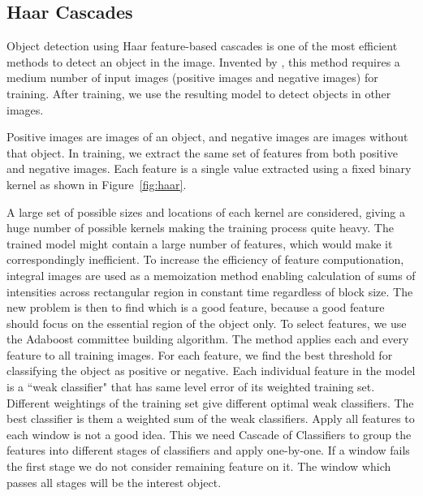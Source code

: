 \subsection{Haar Cascades}
Object detection using Haar feature-based cascades is one of the most efficient methods to detect an object in the image. Invented by , this method requires a medium number of input images (positive images and negative images) for training. After training, we use the resulting model to detect objects in other images.

Positive images are images of an object, and negative images are images without that object. In training, we extract the same set of features from both positive and negative images. Each feature is a single value extracted using a fixed binary kernel as shown in Figure~\ref{fig:haar}.

A large set of possible sizes and locations of each kernel are considered, giving a huge number of possible kernels making the training process quite heavy. The trained model might contain a large number of features, which would make it correspondingly inefficient. To increase the efficiency of feature computionation, integral images are used as a memoization method enabling calculation of sums of intensities across rectangular region in constant time regardless of block size. The new problem is then to find which is a good feature, because a good feature should focus on the essential region of the object only. To select features, we use the Adaboost committee building algorithm. The method applies each and every feature to all training images. For each feature, we find the best threshold for classifying the object as positive or negative. Each individual feature in the model is a \textquotedblleft weak classifier" that has same level error of its weighted training set. Different weightings of the training set give different optimal weak classifiers. The best classifier is them a weighted sum of the weak classifiers. Apply all features to each window is not a good idea. This we need Cascade of Classifiers to group the features into different stages of classifiers and apply one-by-one. If a window fails the first stage we do not consider remaining feature on it. The window which passes all stages will be the interest object.

